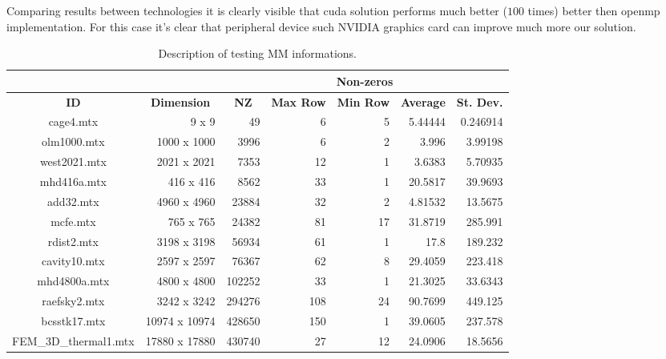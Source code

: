 	Comparing results between technologies it is clearly visible that \gls{cuda} solution performs much better ($100$ times) better then \gls{openmp} implementation. For this case it's clear that peripheral device such NVIDIA graphics card can improve much more our solution.
	
	
	\begin{table}[!htp]
		\centering
		\caption{Description of testing \glsdesc{MM} informations.}
		\label{tab:matrix-info}
		\begin{adjustbox}{max width=\textwidth}
			\begin{tabular}{cr|r|r|r|r|r|}
				\cline{3-7}
				&  & \multicolumn{5}{c|}{\textbf{Non-zeros}} \\ \hline
				\multicolumn{1}{|c|}{\textbf{ID}} & \multicolumn{1}{c|}{\textbf{Dimension}} & \multicolumn{1}{c|}{\textbf{NZ}} & \multicolumn{1}{c|}{\textbf{Max Row}} & \multicolumn{1}{c|}{\textbf{Min Row}} & \multicolumn{1}{c|}{\textbf{Average}} & \multicolumn{1}{c|}{\textbf{St. Dev.}} \\ \hline \hline
				\multicolumn{1}{|c|}{cage4.mtx} & 9 x 9 & 49 & 6 & 5 & 5.44444 & 0.246914 \\ \hline
				\multicolumn{1}{|c|}{olm1000.mtx} & 1000 x 1000 & 3996 & 6 & 2 & 3.996 & 3.99198 \\ \hline
				\multicolumn{1}{|c|}{west2021.mtx} & 2021 x 2021 & 7353 & 12 & 1 & 3.6383 & 5.70935 \\ \hline
				\multicolumn{1}{|c|}{mhd416a.mtx} & 416 x 416 & 8562 & 33 & 1 & 20.5817 & 39.9693 \\ \hline
				\multicolumn{1}{|c|}{add32.mtx} & 4960 x 4960 & 23884 & 32 & 2 & 4.81532 & 13.5675 \\ \hline
				\multicolumn{1}{|c|}{mcfe.mtx} & 765 x 765 & 24382 & 81 & 17 & 31.8719 & 285.991 \\ \hline
				\multicolumn{1}{|c|}{rdist2.mtx} & 3198 x 3198 & 56934 & 61 & 1 & 17.8 & 189.232 \\ \hline
				\multicolumn{1}{|c|}{cavity10.mtx} & 2597 x 2597 & 76367 & 62 & 8 & 29.4059 & 223.418 \\ \hline
				\multicolumn{1}{|c|}{mhd4800a.mtx} & 4800 x 4800 & 102252 & 33 & 1 & 21.3025 & 33.6343 \\ \hline
				\multicolumn{1}{|c|}{raefsky2.mtx} & 3242 x 3242 & 294276 & 108 & 24 & 90.7699 & 449.125 \\ \hline
				\multicolumn{1}{|c|}{bcsstk17.mtx} & 10974 x 10974 & 428650 & 150 & 1 & 39.0605 & 237.578 \\ \hline
				\multicolumn{1}{|c|}{FEM\_3D\_thermal1.mtx} & 17880 x 17880 & 430740 & 27 & 12 & 24.0906 & 18.5656 \\ \hline

\end{tabular}
\end{adjustbox}
\end{table}

